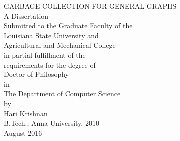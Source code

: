 \documentclass[12pt,letterpaper]{report}
\begin{document}

\thispagestyle{empty}
	\begin{center}
	\vspace*{0.5in}
	\Large{GARBAGE COLLECTION FOR GENERAL GRAPHS}\\
	\vspace{2in}
	\normalsize{A Dissertation\\}
	\vspace{\baselineskip}
	\normalsize{Submitted to the Graduate Faculty of the\\}
        \normalsize{Louisiana State University and\\}
        \normalsize{Agricultural and Mechanical College\\}
	\normalsize{in partial fulfillment of the\\}
        \normalsize{requirements for the degree of\\}
        \normalsize{Doctor of Philosophy\\}
        \vspace{\baselineskip}        
	\normalsize{in\\}
        \vspace{\baselineskip}
	\normalsize{The Department of Computer Science \\}
	\vspace{.5in}
	\normalsize{by\\}
	\normalsize{Hari Krishnan\\}
        \normalsize{B.Tech., Anna University, 2010\\}
	\normalsize{August 2016\\}
	\end{center}

\pagebreak


 

\renewcommand{\cftchapdotsep}{\cftdotsep}



  \begin{doublespace}
% 
  \end{doublespace}
\newpage
\end{document}
